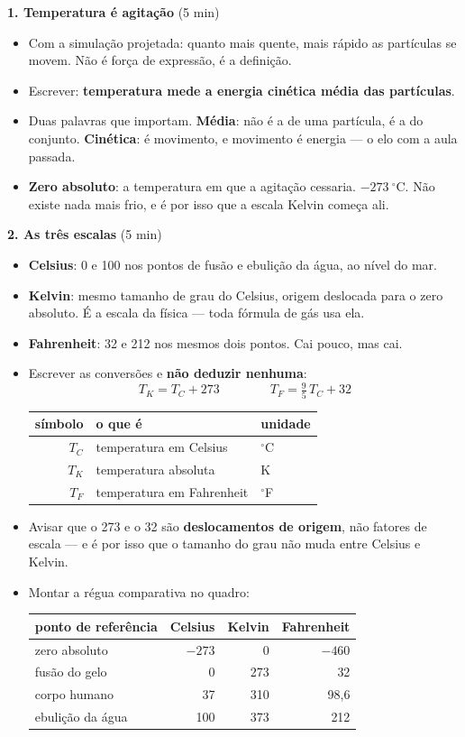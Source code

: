 \documentclass[11pt,a4paper]{article}
\makeatletter
\newcommand{\variaveis}[1]{%
  \begingroup\footnotesize
  \setlength{\tabcolsep}{6pt}
  \renewcommand{\arraystretch}{1.15}
  \begin{center}
  \begin{tabular}{@{}rll@{}}
    \toprule
    \textbf{s\'imbolo} & \textbf{o que \'e} & \textbf{unidade} \\
    \midrule
    #1
    \bottomrule
  \end{tabular}
  \end{center}
  \endgroup}
\makeatother
\begin{document}
\begin{quadro}
\textbf{1. Temperatura \'e agita\c{c}\~ao} (5 min)
\begin{itemize}[nosep]
  \item Com a simula\c{c}\~ao projetada: quanto mais quente, mais r\'apido as
        part\'iculas se movem. N\~ao \'e for\c{c}a de express\~ao, \'e a defini\c{c}\~ao.
  \item Escrever: \textbf{temperatura mede a energia cin\'etica m\'edia das
        part\'iculas}.
  \item Duas palavras que importam. \textbf{M\'edia}: n\~ao \'e a de uma
        part\'icula, \'e a do conjunto. \textbf{Cin\'etica}: \'e movimento, e
        movimento \'e energia --- o elo com a aula passada.
  \item \textbf{Zero absoluto}: a temperatura em que a agita\c{c}\~ao cessaria.
        $-273\ ^\circ$C. N\~ao existe nada mais frio, e \'e por isso que a
        escala Kelvin come\c{c}a ali.
\end{itemize}

\medskip
\textbf{2. As tr\^es escalas} (5 min)
\begin{itemize}[nosep]
  \item \textbf{Celsius}: 0 e 100 nos pontos de fus\~ao e ebuli\c{c}\~ao da \'agua,
        ao n\'ivel do mar.
  \item \textbf{Kelvin}: mesmo tamanho de grau do Celsius, origem
        deslocada para o zero absoluto. \'E a escala da f\'isica --- toda
        f\'ormula de g\'as usa ela.
  \item \textbf{Fahrenheit}: 32 e 212 nos mesmos dois pontos. Cai pouco,
        mas cai.
  \item Escrever as convers\~oes e \textbf{n\~ao deduzir nenhuma}:
  \[
    \boxed{T_K = T_C + 273} \qquad\qquad
    \boxed{T_F = \tfrac{9}{5}\,T_C + 32}
  \]
  \variaveis{
    $T_C$ & temperatura em Celsius     & $^\circ$C \\
    $T_K$ & temperatura absoluta       & K \\
    $T_F$ & temperatura em Fahrenheit  & $^\circ$F \\
  }
  \item Avisar que o 273 e o 32 s\~ao \textbf{deslocamentos de origem},
        n\~ao fatores de escala --- e \'e por isso que o tamanho do grau
        n\~ao muda entre Celsius e Kelvin.
  \item Montar a r\'egua comparativa no quadro:
  \begin{center}\small
    \begin{tabular}{@{}lrrr@{}}
      \toprule
      ponto de refer\^encia & Celsius & Kelvin & Fahrenheit \\
      \midrule
      zero absoluto        & $-273$ & 0   & $-460$ \\
      fus\~ao do gelo        & 0      & 273 & 32 \\
      corpo humano         & 37     & 310 & 98{,}6 \\
      ebuli\c{c}\~ao da \'agua     & 100    & 373 & 212 \\
      \bottomrule
    \end{tabular}
  \end{center}
\end{itemize}


\end{quadro}
\end{document}

